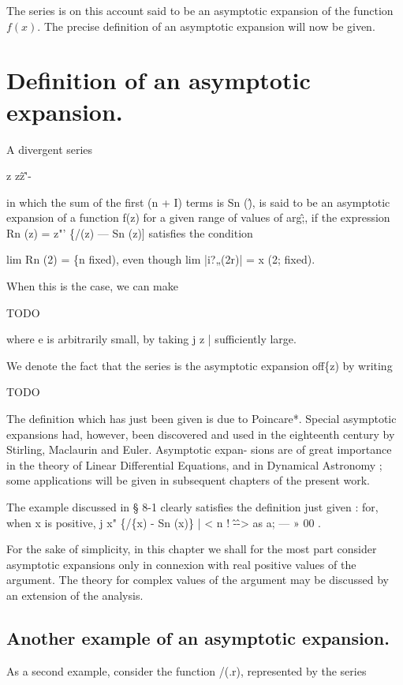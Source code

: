 The series is on this account said to be an asymptotic expansion of the
function $f(x)$. The precise definition of an asymptotic expansion will now
be given.

\section{Definition of an asymptotic expansion.}
A divergent series

z z\^ z\^'-

in which the sum of the first (n + I) terms is Sn (\^), is said to be an asymptotic
expansion of a function f(z) for a given range of values of arg\^;, if the
expression Rn (z) = z"' \{/(z) — Sn (z)] satisfies the condition

lim Rn (2) = \{n fixed),
even though lim |i?„(2r)| = x (2; fixed).

When this is the case, we can make

TODO

where e is arbitrarily small, by taking j z | sufficiently large.

We denote the fact that the series is the asymptotic expansion off\{z) by
writing

TODO

The definition which has just been given is due to Poincare*. Special
asymptotic expansions had, however, been discovered and used in the
eighteenth century by Stirling, Maclaurin and Euler. Asymptotic expan-
sions are of great importance in the theory of Linear Differential Equations,
and in Dynamical Astronomy ; some applications will be given in subsequent
chapters of the present work.

The example discussed in § 8-1 clearly satisfies the definition just
given : for, when x is positive, j x" \{/\{x) - Sn (x)\} | < n ! \^-\^ -> as a; — » 00 .

For the sake of simplicity, in this chapter we shall for the most part consider
asymptotic expansions only in connexion with real positive values of the argument.
The theory for complex values of the argument may be discussed by an extension of the
analysis.

\subsection{Another example of an asymptotic expansion.}

As a second example, consider the function /(.r), represented by the series



